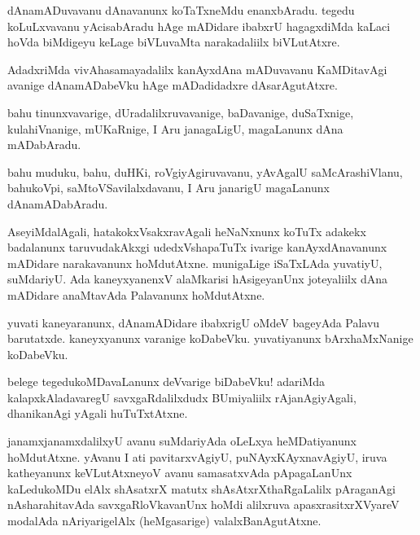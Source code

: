 \documentclass{article}
\begin{document}
\begin{mng}%
dAnamADuvavanu dAnavanunx koTaTxneMdu enanxbAradu. tegedu
koLuLxvavanu yAcisabAradu hAge mADidare ibabxrU hagagxdiMda kaLaci
hoVda biMdigeyu keLage biVLuvaMta narakadaliilx biVLutAtxre.
\end{mng}

\begin{mng}%
AdadxriMda vivAhasamayadalilx kanAyxdAna mADuvavanu KaMDitavAgi
avanige dAnamADabeVku hAge mADadidadxre dAsarAgutAtxre.
\end{mng}

\begin{mng}%
bahu tinunxvavarige, dUradalilxruvavanige, baDavanige, duSaTxnige,
kulahiVnanige, mUKaRnige, I Aru janagaLigU, magaLanunx dAna mADabAradu.
\end{mng}

\begin{mng}%
bahu muduku, bahu, duHKi, roVgiyAgiruvavanu, yAvAgalU saMcArashiVlanu, bahukoVpi, saMtoVSavilalxdavanu, I Aru janarigU
magaLanunx dAnamADabAradu.
\end{mng}

\begin{mng}%
AseyiMdalAgali, hatakokxVsakxravAgali heNaNxnunx koTuTx
adakekx badalanunx taruvudakAkxgi udedxVshapaTuTx ivarige kanAyxdAnavanunx
mADidare narakavanunx hoMdutAtxne. munigaLige iSaTxLAda yuvatiyU,
suMdariyU. Ada kaneyxyanenxV alaMkarisi hAsigeyanUnx joteyaliilx dAna 
mADidare anaMtavAda Palavanunx hoMdutAtxne.
\end{mng}

\begin{mng}%
yuvati kaneyaranunx, dAnamADidare ibabxrigU oMdeV bageyAda
Palavu barutatxde. kaneyxyanunx varanige koDabeVku. yuvatiyanunx
bArxhaMxNanige koDabeVku.
\end{mng}

\begin{mng}%
belege tegedukoMDavaLanunx deVvarige biDabeVku! adariMda
kalapxkAladavaregU savxgaRdalilxdudx BUmiyaliilx rAjanAgiyAgali, dhanikanAgi yAgali huTuTxtAtxne.
\end{mng}

\begin{mng}%
janamxjanamxdalilxyU avanu suMdariyAda oLeLxya heMDatiyanunx 
hoMdutAtxne. yAvanu I ati pavitarxvAgiyU, puNAyxKAyxnavAgiyU,
iruva katheyanunx keVLutAtxneyoV avanu samasatxvAda pApagaLanUnx
kaLedukoMDu elAlx shAsatxrX matutx shAsAtxrXthaRgaLalilx pAraganAgi nAsharahitavAda
savxgaRloVkavanUnx hoMdi alilxruva apasxrasitxrXVyareV modalAda
nAriyarigelAlx (heMgasarige) valalxBanAgutAtxne.
\end{mng}
\end{document}
